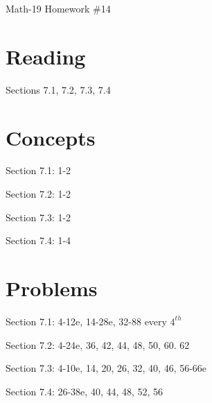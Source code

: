 \documentclass[letterpaper,12pt,fleqn]{article}
\begin{document}
\begin{center}
\Large Math-19 Homework \#14
\end{center}

\section*{Reading}

Sections 7.1, 7.2, 7.3, 7.4

\section*{Concepts}

Section 7.1: 1-2

Section 7.2: 1-2

Section 7.3: 1-2

Section 7.4: 1-4

\section*{Problems}

Section 7.1: 4-12e, 14-28e, 32-88 every $4^{th}$

Section 7.2: 4-24e, 36, 42, 44, 48, 50, 60. 62

Section 7.3: 4-10e, 14, 20, 26, 32, 40, 46, 56-66e

Section 7.4: 26-38e, 40, 44, 48, 52, 56
\end{document}

